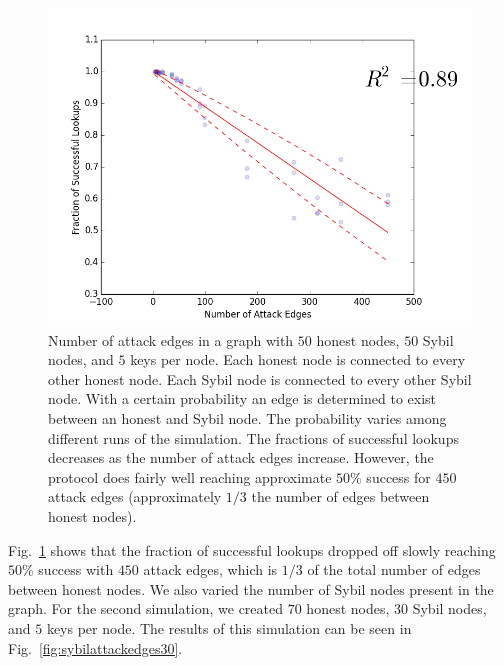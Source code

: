 \documentclass[letter]{article}
\begin{document}
\begin{figure}[!h]
\centering
\includegraphics[width=0.9\columnwidth]{sybilattackedges}
\caption{Number of attack edges in a graph with $50$ honest nodes, $50$ Sybil nodes, and $5$ keys per node. Each honest node is connected to every other honest node. Each Sybil node is connected to every other Sybil node. With a certain probability an edge is determined to exist between an honest and Sybil node. The probability varies among different runs of the simulation. The fractions of successful lookups decreases as the number of attack edges increase. However, the protocol does fairly well reaching approximate $50\%$ success for $450$ attack edges (approximately $1/3$ the number of edges between honest nodes).}
\label{fig:sybilattackedges}
\end{figure}

Fig.~\ref{fig:sybilattackedges} shows that the fraction of successful lookups dropped off slowly reaching $50\%$ success with $450$ attack edges, which is $1/3$ of the total number of edges between honest nodes. We also varied the number of Sybil nodes present in the graph. For the second simulation, we created $70$ honest nodes, $30$ Sybil nodes, and $5$ keys per node. The results of this simulation can be seen in Fig.~\ref{fig:sybilattackedges30}.
\end{document}
